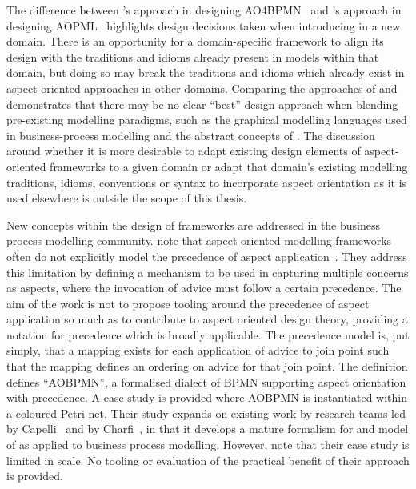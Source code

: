 The difference between \citeauthor{charfi2010AO4BPMN}'s approach in designing
AO4BPMN~\cite{charfi2010AO4BPMN} and \citeauthor{Cappelli_AOBPM}'s approach in
designing AOPML~\cite{Cappelli_AOBPM} highlights design decisions taken when
introducing \aspectorientation{} in a new domain. There is an opportunity for a
domain-specific \aspectorientation{} framework to align its design with the
traditions and idioms already present in models within that domain, but doing so
may break the traditions and idioms which already exist in aspect-oriented
approaches in other domains.  Comparing the approaches of
\citeauthor{charfi2010AO4BPMN} and \citeauthor{Cappelli_AOBPM} demonstrates that
there may be no clear ``best'' design approach when blending pre-existing
modelling paradigms, such as the graphical modelling languages used in
business-process modelling and the abstract concepts of \aspectorientation{}.
The discussion around whether it is more desirable to adapt existing design
elements of aspect-oriented frameworks to a given domain or adapt that domain's
existing modelling traditions, idioms, conventions or syntax to incorporate
aspect orientation as it is used elsewhere is outside the scope of this thesis.

New concepts within the design of \aspectorientation{} frameworks are addressed in
the business process modelling community.  note
that aspect oriented modelling frameworks often do not explicitly model the
precedence of aspect application~\cite{jalali2012aspect}. They address this
limitation by defining a mechanism to be used in capturing multiple concerns as
aspects, where the invocation of advice must follow a certain precedence. The
aim of the work is not to propose tooling around the precedence of aspect
application so much as to contribute to aspect oriented design theory, providing
a notation for precedence which is broadly applicable. The precedence model is,
put simply, that a mapping exists for each application of advice to join point
such that the mapping defines an ordering on advice for that join point. The
definition defines ``AOBPMN'', a formalised dialect of BPMN supporting aspect
orientation with precedence. A case study is provided where AOBPMN is
instantiated within a coloured Petri net. Their study expands on existing work
by research teams led by Capelli~\cite{Cappelli_AOBPM,da2020implementation} and
by Charfi~\cite{charfi2007ao4bpel}, in that it develops a mature formalism for
and model of \aspectorientation{} as applied to business process modelling.
However, \citeauthor{jalali2012aspect} note that their case study is limited in
scale. No tooling or evaluation of the practical benefit of their approach is
provided.%


